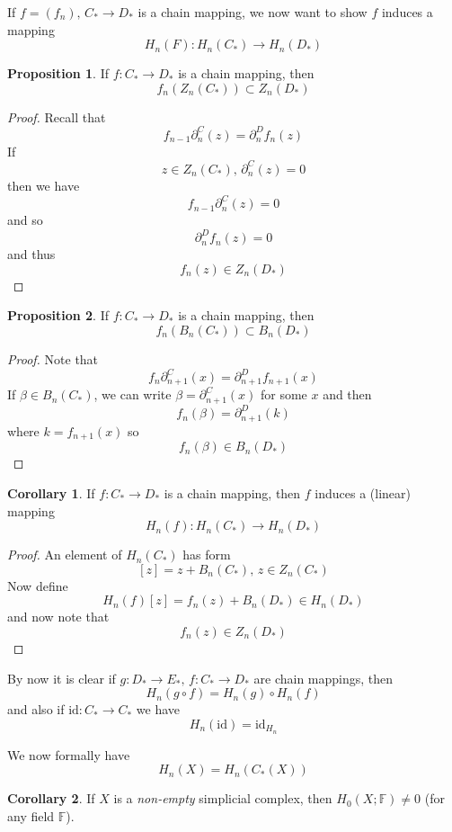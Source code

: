 \documentclass[a4paper,14pt]{extarticle}
\theoremstyle{definition}
\newtheorem*{corollary}{Corollary}
\newtheorem*{proposition}{Proposition}
\begin{document}
If $f=(f_n),\,C_*\rightarrow D_*$ is a chain mapping, we now want to show $f$ induces a mapping
\[H_n(F):H_n(C_*)\rightarrow H_n(D_*)\]

\begin{proposition}
	If $f:C_*\rightarrow D_*$ is a chain mapping, then \[f_n(Z_n(C_*))\subset Z_n(D_*)\]
\end{proposition}

\begin{proof}
	Recall that \[f_{n-1}\partial_n^C(z)=\partial_n^D f_n(z)\] If \[z\in Z_n(C_*),\,\partial_n^C(z)=0\] then we have \[f_{n-1}\partial_n^C(z)=0\] and so
	\[\partial_n^D f_n(z)=0\] and thus \[f_n(z)\in Z_n(D_*)\]
\end{proof}

\begin{proposition}
	If $f:C_*\rightarrow D_*$ is a chain mapping, then \[f_n(B_n(C_*))\subset B_n(D_*)\]
\end{proposition}

\begin{proof}
	Note that \[f_n\partial_{n+1}^C(x)=\partial_{n+1}^D f_{n+1}(x)\] If $\beta\in B_n(C_*)$, we can write $\beta=\partial_{n+1}^C(x)$ for some $x$ and then
	\[f_n(\beta)=\partial_{n+1}^D(k)\] where $k=f_{n+1}(x)$ so \[f_n(\beta)\in B_n(D_*)\]
\end{proof}

\begin{corollary}
	If $f:C_*\rightarrow D_*$ is a chain mapping, then $f$ induces a (linear) mapping \[H_n(f):H_n(C_*)\rightarrow H_n(D_*)\]
\end{corollary}

\begin{proof}
	An element of $H_n(C_*)$ has form \[[z]=z+B_n(C_*), \,z\in Z_n(C_*)\] Now define \[H_n(f)[z]=f_n(z)+B_n(D_*)\in H_n(D_*)\] and now note that \[f_n(z)\in Z_n(D_*)\]
\end{proof}

By now it is clear if $g:D_*\rightarrow E_*, \,f:C_*\rightarrow D_*$ are chain mappings, then \[H_n(g\circ f)=H_n(g)\circ H_n(f)\] and also if $\text{id}:C_*\rightarrow C_*$ we have
\[H_n(\text{id})=\text{id}_{H_n}\]

We now formally have \[H_n(X)=H_n(C_*(X))\]

\begin{corollary}
If $X$ is a \emph{non-empty} simplicial complex, then $H_0(X;\mathbb{F})\neq0$ (for any field $\mathbb{F}$).
\end{corollary}
\end{document}
